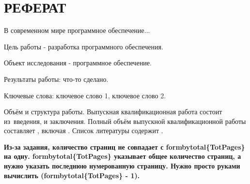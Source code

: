 \chapter*{\centering РЕФЕРАТ}

В современном мире программное обеспечение...

Цель работы - разработка программного обеспечения.

Объект исследования - программное обеспечение.


Результаты работы: что-то сделано.

Ключевые слова: ключевое слово 1, ключевое слово 2.

Объём и структура работы.
Выпускная квалификационная работа состоит из~введения,
 и
заключения.
Полный объём выпускной квалификационной работы составляет
, включая
.
Список литературы содержит
.

\textbf
{
    Из-за задания, количество страниц не совпадает с formbytotal\{TotPages\} на одну.
    formbytotal\{TotPages\} указывает общее количество страниц, а нужно указать последнюю нумерованную страницу.
    Нужно просто руками вычислить (formbytotal\{TotPages\} - 1).
}